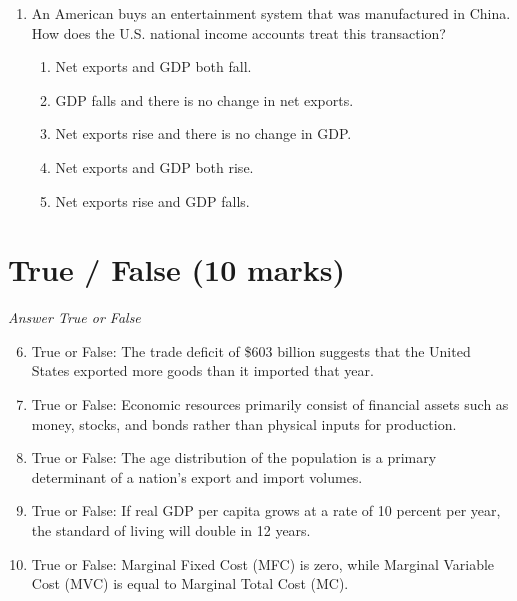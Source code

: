 \documentclass[12pt]{article}
\begin{document}
\begin{enumerate}[label=\arabic*.]
\begin{enumerate}[label=(\alph*)]
    \item price = marginal revenue.
    \item price = minimum average cost.
    \item price = minimum average variable cost.
    \item price = marginal cost.
\end{enumerate}
\item An American buys an entertainment system that was manufactured in China. How does the U.S. national income accounts treat this transaction?
\begin{enumerate}[label=(\alph*)]
    \item Net exports and GDP both fall.
    \item GDP falls and there is no change in net exports.
    \item Net exports rise and there is no change in GDP.
    \item Net exports and GDP both rise.
    \item Net exports rise and GDP falls.
\end{enumerate}
\end{enumerate}

\section*{True / False (10 marks)}
\textit{Answer True or False}
\begin{enumerate}[label=\arabic*.]
\setcounter{enumi}{5}
\item True or False: The trade deficit of \$603 billion suggests that the United States exported more goods than it imported that year.
\item True or False: Economic resources primarily consist of financial assets such as money, stocks, and bonds rather than physical inputs for production.
\item True or False: The age distribution of the population is a primary determinant of a nation's export and import volumes.
\item True or False: If real GDP per capita grows at a rate of 10 percent per year, the standard of living will double in 12 years.
\item True or False: Marginal Fixed Cost (MFC) is zero, while Marginal Variable Cost (MVC) is equal to Marginal Total Cost (MC).
\end{enumerate}
\end{document}
